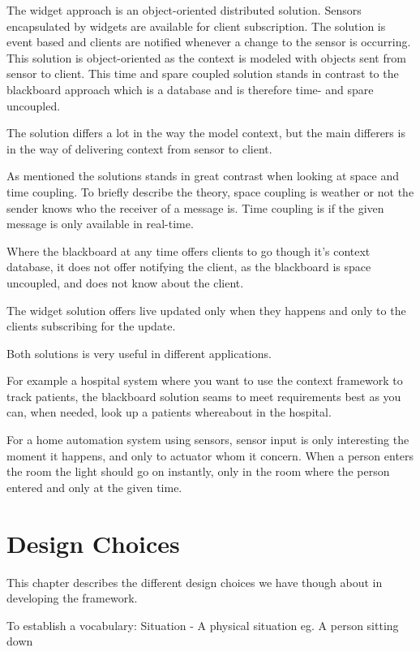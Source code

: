 \documentclass[]{report}
\begin{document}
The widget approach is an object-oriented distributed solution. Sensors encapsulated by widgets are available for client subscription. The solution is event based and clients are notified whenever a change to the sensor is occurring. This solution is object-oriented as the context is modeled with objects sent from sensor to client. This time and spare coupled solution stands in contrast to the blackboard approach which is a database and is therefore time- and spare uncoupled.

The solution differs a lot in the way the model context, but the main differers is in the way of delivering context from sensor to client.

As mentioned the solutions stands in great contrast when looking at space and time coupling. To briefly describe the theory, space coupling is weather or not the sender knows who the receiver of a message is. Time coupling is if the given message is only available in real-time. 

Where the blackboard at any time offers clients to go though it's context database, it does not offer notifying the client, as the blackboard is space uncoupled, and does not know about the client.

The widget solution offers live updated only when they happens and only to the clients subscribing for the update.

Both solutions is very useful in different applications.

For example a hospital system where you want to use the context framework to track patients, the blackboard solution seams to meet requirements best as you can, when needed, look up a patients whereabout in the hospital.

For a home automation system using sensors, sensor input is only interesting the moment it happens, and only to actuator whom it concern. When a person enters the room the light should go on instantly, only in the room where the person entered and only at the given time.


  

\chapter{Design Choices}

This chapter describes the different design choices we have though about in developing the framework.

To establish a vocabulary:
	Situation - A physical situation eg. A person sitting down
	
\end{document}
